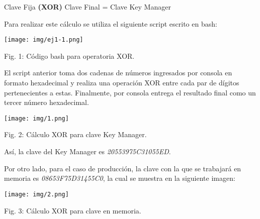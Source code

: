 \documentclass[12pt,oneside,a4paper]{book}
\begin{document}
\vspace{1em}

\begin{center}
    Clave Fija \textbf{(XOR)} Clave Final = Clave Key Manager
\end{center}

\vspace{1em}

Para realizar este cálculo se utiliza el siguiente script escrito en bash:

\vspace{2em}

\begin{center}
    \texttt{[image: img/ej1-1.png]}
    
\vspace{0.1em}
    
    Fig. 1: Código bash para operatoria XOR.
\end{center}

\vspace{2em}

\hspace{20pt}
El script anterior toma dos cadenas de números ingresados por consola en formato hexadecimal y realiza una operación XOR entre cada par de dígitos pertenecientes a estas. Finalmente, por consola entrega el resultado final como un tercer número hexadecimal.

\vspace{2em}

\begin{center}
    \texttt{[image: img/1.png]}
    
\vspace{0.1em}
    
    Fig. 2: Cálculo XOR para clave Key Manager.
\end{center}

\vspace{2em}

Así, la clave del Key Manager es \textit{20553975C31055ED}.

\vspace{1em}

\hspace{20pt}
Por otro lado, para el caso de producción, la clave con la que se trabajará en memoria es \textit{08653F75D31455C0}, la cual se muestra en la siguiente imagen:

\vspace{2em}

\begin{center}
    \texttt{[image: img/2.png]}
    
\vspace{0.1em}
    
    Fig. 3: Cálculo XOR para clave en memoria.
\end{center}
\end{document}
